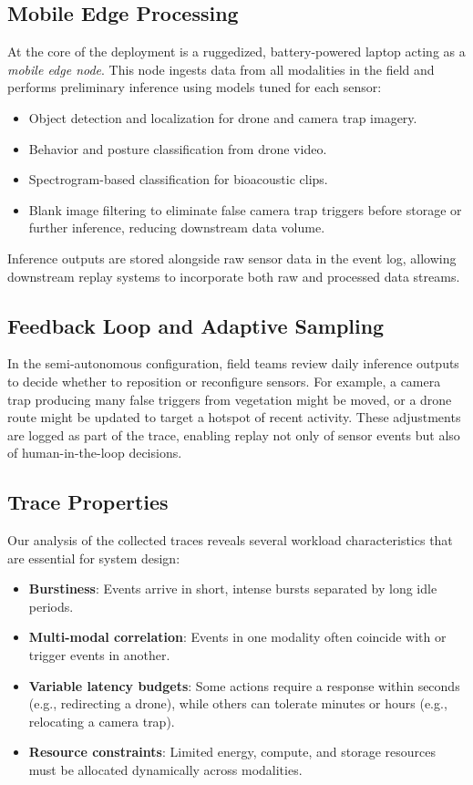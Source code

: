 \documentclass[letterpaper,twocolumn,10pt]{article}
\begin{document}
\subsection{Mobile Edge Processing}
At the core of the deployment is a ruggedized, battery-powered laptop acting as a \textit{mobile edge node}. This node ingests data from all modalities in the field and performs preliminary inference using models tuned for each sensor:
\begin{itemize}
    \item Object detection and localization for drone and camera trap imagery.
    \item Behavior and posture classification from drone video.
    \item Spectrogram-based classification for bioacoustic clips.
    \item Blank image filtering to eliminate false camera trap triggers before storage or further inference, reducing downstream data volume.
\end{itemize}
Inference outputs are stored alongside raw sensor data in the event log, allowing downstream replay systems to incorporate both raw and processed data streams.

\subsection{Feedback Loop and Adaptive Sampling}
In the semi-autonomous configuration, field teams review daily inference outputs to decide whether to reposition or reconfigure sensors. For example, a camera trap producing many false triggers from vegetation might be moved, or a drone route might be updated to target a hotspot of recent activity. These adjustments are logged as part of the trace, enabling replay not only of sensor events but also of human-in-the-loop decisions.

\subsection{Trace Properties}
Our analysis of the collected traces reveals several workload characteristics that are essential for system design:
\begin{itemize}
    \item \textbf{Burstiness}: Events arrive in short, intense bursts separated by long idle periods.
    \item \textbf{Multi-modal correlation}: Events in one modality often coincide with or trigger events in another.
    \item \textbf{Variable latency budgets}: Some actions require a response within seconds (e.g., redirecting a drone), while others can tolerate minutes or hours (e.g., relocating a camera trap).
    \item \textbf{Resource constraints}: Limited energy, compute, and storage resources must be allocated dynamically across modalities.
\end{itemize}
\end{document}
